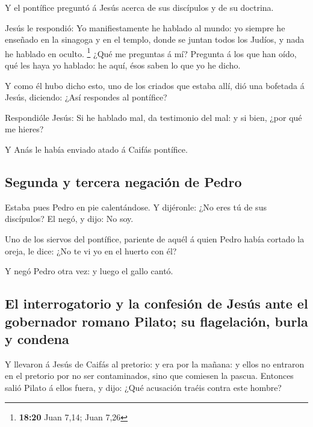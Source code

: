  Y el pontífice preguntó á Jesús acerca de sus discípulos
y de su doctrina.

 Jesús le respondió: Yo manifiestamente he hablado al
mundo: yo siempre he enseñado en la sinagoga y en el templo, donde se
juntan todos los Judíos, y nada he hablado en oculto. \footnote{\textbf{18:20}
  Juan 7,14; Juan 7,26}  ¿Qué me preguntas á mí? Pregunta
á los que han oído, qué les haya yo hablado: he aquí, ésos saben lo que
yo he dicho.

 Y como él hubo dicho esto, uno de los criados que estaba
allí, dió una bofetada á Jesús, diciendo: ¿Así respondes al pontífice?

 Respondióle Jesús: Si he hablado mal, da testimonio del
mal: y si bien, ¿por qué me hieres?

 Y Anás le había enviado atado á Caifás pontífice.

\hypertarget{segunda-y-tercera-negaciuxf3n-de-pedro}{%
\subsection{Segunda y tercera negación de
Pedro}\label{segunda-y-tercera-negaciuxf3n-de-pedro}}

 Estaba pues Pedro en pie calentándose. Y dijéronle: ¿No
eres tú de sus discípulos? El negó, y dijo: No soy.

 Uno de los siervos del pontífice, pariente de aquél á
quien Pedro había cortado la oreja, le dice: ¿No te vi yo en el huerto
con él?

 Y negó Pedro otra vez: y luego el gallo cantó.

\hypertarget{el-interrogatorio-y-la-confesiuxf3n-de-jesuxfas-ante-el-gobernador-romano-pilato-su-flagelaciuxf3n-burla-y-condena}{%
\subsection{El interrogatorio y la confesión de Jesús ante el gobernador
romano Pilato; su flagelación, burla y
condena}\label{el-interrogatorio-y-la-confesiuxf3n-de-jesuxfas-ante-el-gobernador-romano-pilato-su-flagelaciuxf3n-burla-y-condena}}

 Y llevaron á Jesús de Caifás al pretorio: y era por la
mañana: y ellos no entraron en el pretorio por no ser contaminados, sino
que comiesen la pascua.  Entonces salió Pilato á ellos
fuera, y dijo: ¿Qué acusación traéis contra este hombre?

